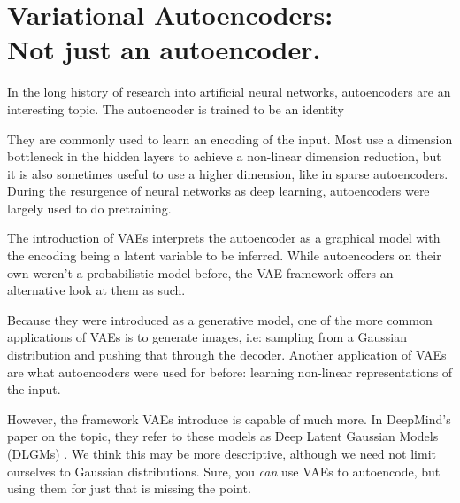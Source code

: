 \documentclass{article}
\begin{document}



\section{Variational Autoencoders:\\Not just an autoencoder.}





In the long history of research into artificial neural networks, autoencoders are an interesting topic. The autoencoder is trained to be an identity 


They are commonly used to learn an encoding of the input. Most use a dimension bottleneck in the hidden layers to achieve a non-linear dimension reduction, but it is also sometimes useful to use a higher dimension, like in sparse autoencoders. During the resurgence of neural networks as deep learning, autoencoders were largely used to do pretraining.

The introduction of VAEs \citep{kingma2013auto} interprets the autoencoder as a graphical model with the encoding being a latent variable to be inferred. While autoencoders on their own weren’t a probabilistic model before, the VAE framework offers an alternative look at them as such. 

Because they were introduced as a generative model, one of the more common applications of VAEs is to generate images, i.e: sampling from a Gaussian distribution and pushing that through the decoder. Another application of VAEs are what autoencoders were used for before: learning non-linear representations of the input.

However, the framework VAEs introduce is capable of much more. In DeepMind's paper on the topic, they refer to these models as Deep Latent Gaussian Models (DLGMs) \citep{rezende2014stochastic}. We think this may be more descriptive, although we need not limit ourselves to Gaussian distributions. Sure, you \emph{can} use VAEs to autoencode, but using them for just that is missing the point.
\end{document}
